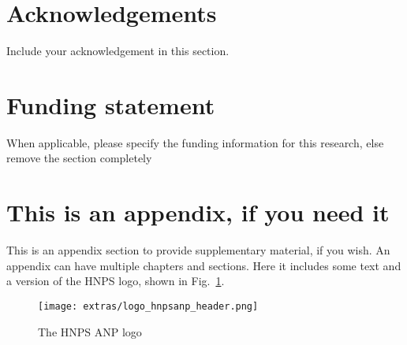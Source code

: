 \documentclass[
  manuscript=article,  %
  layout=publish,  %
  year=20XX,
  volume=XX,
]{extras/hnpsanp}
\begin{document}


\section*{Acknowledgements}
Include your acknowledgement in this section.


\section*{Funding statement}
When applicable, please specify the funding information for this research, else remove the section completely



\scriptsize
\printbibliography
\normalsize

\appendix

\section{This is an appendix, if you need it}

This is an appendix section to provide supplementary material, if you wish. An appendix can have multiple chapters and sections. Here it includes some text and a version of the HNPS logo, shown in Fig.~\ref{fig:appx}.

\begin{figure}[H]
\centering
\texttt{[image: extras/logo\_hnpsanp\_header.png]}
\caption{The HNPS ANP logo}
\label{fig:appx}
\end{figure}
\end{document}
